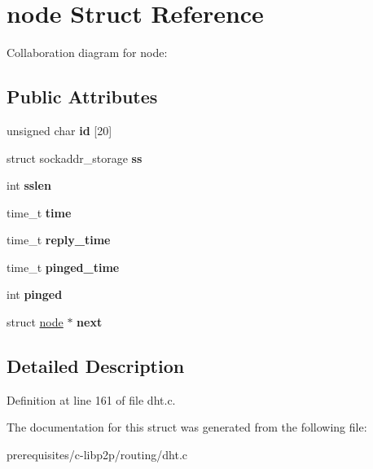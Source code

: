 \hypertarget{structnode}{}\section{node Struct Reference}
\label{structnode}


Collaboration diagram for node\+:
\subsection*{Public Attributes}
\begin{DoxyCompactItemize}
\item 
\mbox{\label{structnode_aa8cc884e2880bb5b87d856a23ee56ade}} 
unsigned char {\bfseries id} \mbox{[}20\mbox{]}
\item 
\mbox{\label{structnode_a0cbeff394caaf2fca0029e776e678eaa}} 
struct sockaddr\+\_\+storage {\bfseries ss}
\item 
\mbox{\label{structnode_a0eb8cd8ba7cf9a44ac293d3016a0fa5c}} 
int {\bfseries sslen}
\item 
\mbox{\label{structnode_a5efd3db1ffe2bd203667bf7594bfee0f}} 
time\+\_\+t {\bfseries time}
\item 
\mbox{\label{structnode_a402d06eb37ef27b080aa4b68b18fc334}} 
time\+\_\+t {\bfseries reply\+\_\+time}
\item 
\mbox{\label{structnode_a5f5c8e9adb27571e10911f65f07bb37e}} 
time\+\_\+t {\bfseries pinged\+\_\+time}
\item 
\mbox{\label{structnode_a7c12d59a7253788a9f5e903e52f0de69}} 
int {\bfseries pinged}
\item 
\mbox{\label{structnode_aa3e8aa83f864292b5a01210f4453fcc0}} 
struct \mbox{\hyperlink{structnode}{node}} $\ast$ {\bfseries next}
\end{DoxyCompactItemize}


\subsection{Detailed Description}


Definition at line 161 of file dht.\+c.



The documentation for this struct was generated from the following file\+:\begin{DoxyCompactItemize}
\item 
prerequisites/c-\/libp2p/routing/dht.\+c\end{DoxyCompactItemize}
